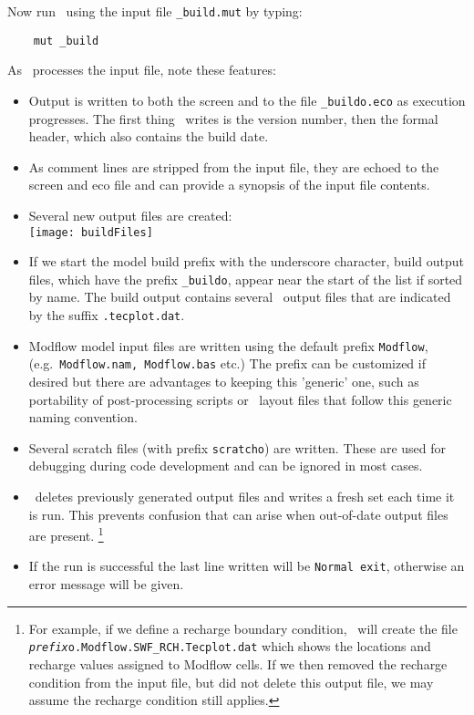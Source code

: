 Now run \mut\ using the input file \texttt{\_build.mut} by typing:
\begin{verbatim}
    mut _build
\end{verbatim}
As \mut\ processes the input file, note these features:
\begin{itemize}
    \item Output is written to both the screen and to the file \verb+_buildo.eco+ as execution progresses.  The first thing \mut\ writes is the version number, then the formal header, which also contains the build date.
    \item  As comment lines are stripped from the input file, they are echoed to the screen and eco file and can provide a synopsis of the input file contents.
    \item  Several new output files are created:
        \vspace{.2in} \\
        \texttt{[image: buildFiles]}
        \vspace{.2in} \\
    \item If we start the model build prefix with the underscore character,  build output files, which have the prefix \texttt{\_buildo}, appear near the start of the list if sorted by name. The build output contains several \tecplot\ output files that are indicated by the suffix \texttt{.tecplot.dat}.
    \item Modflow model input files are written using the default prefix \texttt{Modflow}, (e.g.\ \texttt{Modflow.nam, Modflow.bas} etc.)  The prefix can be customized if desired but there are advantages to keeping this 'generic' one, such as portability of post-processing scripts or \tecplot\ layout files that follow this generic naming convention.
    \item Several scratch files (with prefix \texttt{scratcho}) are written. These are used for debugging during code development and can be ignored in most cases.
    \item \mut\ deletes previously generated output files and writes a fresh set each time it is run.  This prevents confusion that can arise when out-of-date output files are present.
        \footnote{For example, if we define a recharge boundary condition, \mut\ will create the file \texttt{\textit{prefix}o.Modflow.SWF\_RCH.Tecplot.dat} which shows the locations and recharge values assigned to Modflow cells.  If we then removed the recharge condition from the input file, but did not delete this output file, we may assume the recharge condition still applies.}
    \item If the run is successful the last line written will be \texttt{Normal exit}, otherwise an error message will be given.
\end{itemize}


